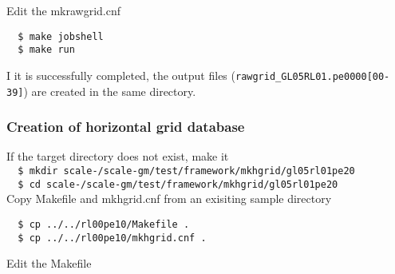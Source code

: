 Edit the mkrawgrid.cnf


\vspace{-4mm}
\begin{verbatim}
  $ make jobshell
  $ make run
\end{verbatim}
I it is successfully completed, the output files ({\verb|rawgrid_GL05RL01.pe0000[00-39]|}) are created in
the same directory.



\subsubsection{Creation of horizontal grid database}
If the target directory does not exist, make it \\

\verb|  $ mkdir scale-|{\version}\verb|/scale-gm/test/framework/mkhgrid/gl05rl01pe20| \\

\verb|  $ cd scale-|{\version}\verb|/scale-gm/test/framework/mkhgrid/gl05rl01pe20| \\
Copy Makefile and mkhgrid.cnf from an exisiting sample directory
\begin{verbatim}
  $ cp ../../rl00pe10/Makefile .
  $ cp ../../rl00pe10/mkhgrid.cnf .
\end{verbatim}

Edit the Makefile

